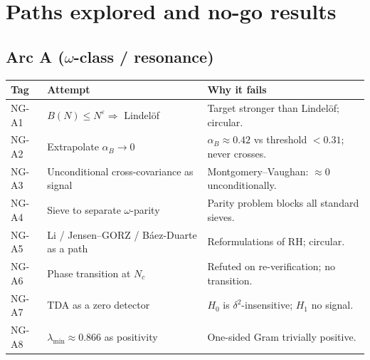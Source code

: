 \documentclass[11pt]{amsart}
\theoremstyle{definition}
\theoremstyle{remark}
\begin{document}
\section{Paths explored and no-go results}

\subsection{Arc A ($\omega$-class / resonance)}
\begin{longtable}{l p{5.4cm} p{6.4cm}}
\toprule \textbf{Tag} & \textbf{Attempt} & \textbf{Why it fails} \\ \midrule \endhead
NG-A1 & $B(N)\le N^\varepsilon\Rightarrow$ Lindel\"of & Target stronger than Lindel\"of; circular. \\
NG-A2 & Extrapolate $\alpha_B\to0$ & $\alpha_B\approx0.42$ vs threshold $<0.31$; never crosses. \\
NG-A3 & Unconditional cross-covariance as signal & Montgomery--Vaughan: $\approx0$ unconditionally. \\
NG-A4 & Sieve to separate $\omega$-parity & Parity problem blocks all standard sieves. \\
NG-A5 & Li / Jensen--GORZ / B\'aez-Duarte as a path & Reformulations of RH; circular. \\
NG-A6 & Phase transition at $N_c$ & Refuted on re-verification; no transition. \\
NG-A7 & TDA as a zero detector & $H_0$ is $\delta^2$-insensitive; $H_1$ no signal. \\
NG-A8 & $\lambda_{\min}\approx0.866$ as positivity & One-sided Gram trivially positive. \\
\bottomrule
\end{longtable}
\end{document}
